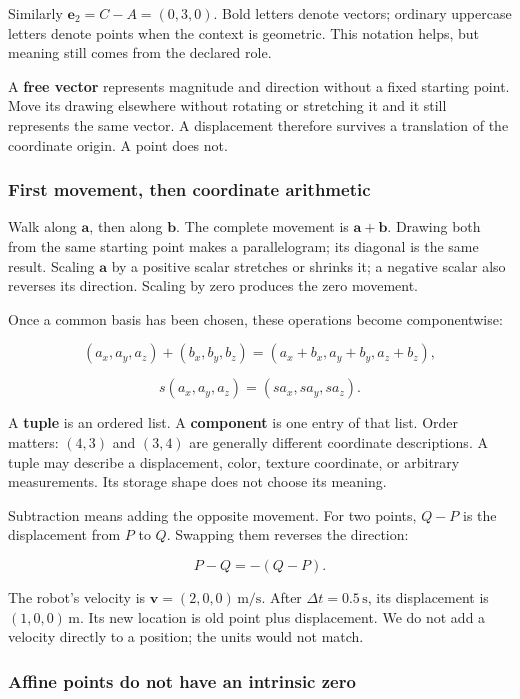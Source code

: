 Similarly \(\mathbf e_2=C-A=(0,3,0)\). Bold letters denote vectors; ordinary uppercase letters denote points when the context is geometric. This notation helps, but meaning still comes from the declared role.

A \textbf{free vector} represents magnitude and direction without a fixed starting point. Move its drawing elsewhere without rotating or stretching it and it still represents the same vector. A displacement therefore survives a translation of the coordinate origin. A point does not.

\subsubsection{First movement, then coordinate arithmetic}\label{first-movement-then-coordinate-arithmetic}

Walk along \(\mathbf a\), then along \(\mathbf b\). The complete movement is \(\mathbf a+\mathbf b\). Drawing both from the same starting point makes a parallelogram; its diagonal is the same result. Scaling \(\mathbf a\) by a positive scalar stretches or shrinks it; a negative scalar also reverses its direction. Scaling by zero produces the zero movement.

Once a common basis has been chosen, these operations become componentwise:

\[
(a_x,a_y,a_z)+(b_x,b_y,b_z)
=(a_x+b_x,a_y+b_y,a_z+b_z),
\]

\[
s(a_x,a_y,a_z)=(sa_x,sa_y,sa_z).
\]

A \textbf{tuple} is an ordered list. A \textbf{component} is one entry of that list. Order matters: \((4,3)\) and \((3,4)\) are generally different coordinate descriptions. A tuple may describe a displacement, color, texture coordinate, or arbitrary measurements. Its storage shape does not choose its meaning.

Subtraction means adding the opposite movement. For two points, \(Q-P\) is the displacement from \(P\) to \(Q\). Swapping them reverses the direction:

\[
P-Q=-(Q-P).
\]

The robot's velocity is \(\mathbf v=(2,0,0)\,\mathrm{m/s}\). After \(\Delta t=0.5\,\mathrm s\), its displacement is \((1,0,0)\,\mathrm m\). Its new location is old point plus displacement. We do not add a velocity directly to a position; the units would not match.

\subsubsection{Affine points do not have an intrinsic zero}\label{affine-points-do-not-have-an-intrinsic-zero}

